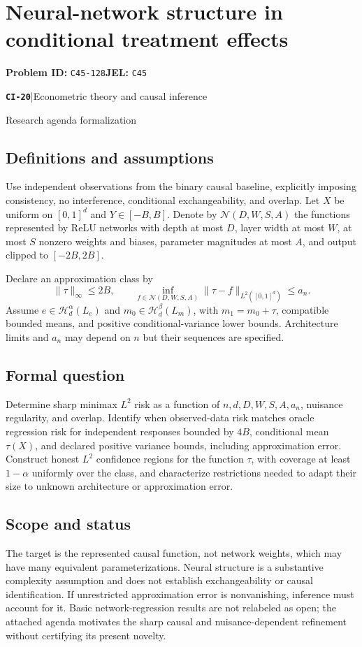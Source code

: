 \documentclass[11pt,a4paper]{article}
\newcommand{\entrymeta}[3]{{\sffamily\small\color{muted}\textbf{\texttt{#1}}\quad|\quad #2\par #3\par}}
\begin{document}
\section*{Neural-network structure in conditional treatment effects}
\textbf{Problem ID:} \texttt{C45-128}\quad \textbf{JEL:} \texttt{C45}\par
\label{problem:OP-0499}
\label{beyond:CI-20}
\entrymeta{CI-20}{Econometric theory and causal inference}{Research agenda formalization}
\subsection*{Definitions and assumptions}
Use independent observations from the binary causal baseline, explicitly imposing consistency, no interference, conditional exchangeability, and overlap. Let $X$ be uniform on $[0,1]^d$ and $Y\in[-B,B]$. Denote by $\mathcal N(D,W,S,A)$ the functions represented by ReLU networks with depth at most $D$, layer width at most $W$, at most $S$ nonzero weights and biases, parameter magnitudes at most $A$, and output clipped to $[-2B,2B]$.

Declare an approximation class by
\[
\|\tau\|_\infty\leq2B,\qquad
\inf_{f\in\mathcal N(D,W,S,A)}
 \|\tau-f\|_{L^2([0,1]^d)}\leq a_n.
\]
Assume $e\in\mathcal H_d^\alpha(L_e)$ and $m_0\in\mathcal H_d^\beta(L_m)$, with $m_1=m_0+\tau$, compatible bounded means, and positive conditional-variance lower bounds. Architecture limits and $a_n$ may depend on $n$ but their sequences are specified.
\subsection*{Formal question}
Determine sharp minimax $L^2$ risk as a function of $n,d,D,W,S,A,a_n$, nuisance regularity, and overlap. Identify when observed-data risk matches oracle regression risk for independent responses bounded by $4B$, conditional mean $\tau(X)$, and declared positive variance bounds, including approximation error. Construct honest $L^2$ confidence regions for the function $\tau$, with coverage at least $1-\alpha$ uniformly over the class, and characterize restrictions needed to adapt their size to unknown architecture or approximation error.
\subsection*{Scope and status}
The target is the represented causal function, not network weights, which may have many equivalent parameterizations. Neural structure is a substantive complexity assumption and does not establish exchangeability or causal identification. If unrestricted approximation error is nonvanishing, inference must account for it. Basic network-regression results are not relabeled as open; the attached agenda motivates the sharp causal and nuisance-dependent refinement without certifying its present novelty.
\end{document}
